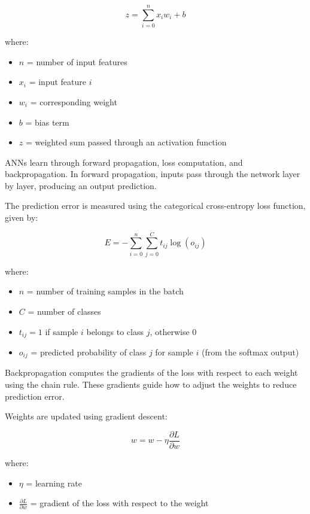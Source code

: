 \documentclass[conference]{IEEEtran}
\begin{document}
\[
z = \sum_{i=0}^{n} x_i w_i + b
\]

where:
\begin{itemize}
    \item $n$ = number of input features
    \item $x_i$ = input feature $i$
    \item $w_i$ = corresponding weight
    \item $b$ = bias term
    \item $z$ = weighted sum passed through an activation function
\end{itemize}

ANNs learn through forward propagation, loss computation, and backpropagation. In forward propagation, inputs pass through the network layer by layer, producing an output prediction.

The prediction error is measured using the categorical cross-entropy loss function, given by:

\[
E = -\sum_{i=0}^{n} \sum_{j=0}^{C} t_{ij} \log(o_{ij})
\]

where:
\begin{itemize}
    \item $n$ = number of training samples in the batch
    \item $C$ = number of classes
    \item $t_{ij} = 1$ if sample $i$ belongs to class $j$, otherwise $0$
    \item $o_{ij}$ = predicted probability of class $j$ for sample $i$ (from the softmax output)
\end{itemize}

Backpropagation computes the gradients of the loss with respect to each weight using the chain rule. These gradients guide how to adjust the weights to reduce prediction error.

Weights are updated using gradient descent:

\[
w = w - \eta \frac{\partial L}{\partial w}
\]

where:
\begin{itemize}
    \item $\eta$ = learning rate
    \item $\frac{\partial L}{\partial w}$ = gradient of the loss with respect to the weight
\end{itemize}
\end{document}
